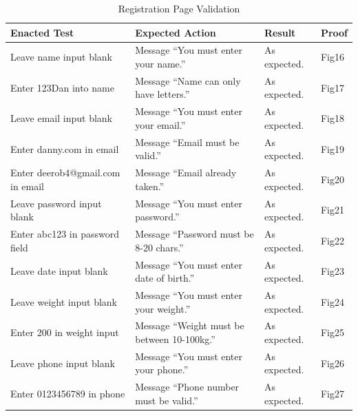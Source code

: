 \documentclass{article}[12pt,a4paper]
\begin{document}
\begin{table}[h]
\begin{tabular}{|l|l|l|l|}
\hline
\textbf{Enacted Test}          & \textbf{Expected Action}                  & \textbf{Result} & \textbf{Proof} \\ \hline
Leave name input blank         & Message ``You must enter your name.''        & As expected.    & Fig16           \\ \hline
Enter 123Dan into name         & Message ``Name can only have letters.''      & As expected.    & Fig17           \\ \hline
Leave email input blank        & Message ``You must enter your email.''       & As expected.    & Fig18           \\ \hline
Enter danny.com in email       & Message ``Email must be valid.''             & As expected.    & Fig19          \\ \hline
Enter deerob4@gmail.com in email & Message ``Email already taken.''             & As expected.    & Fig20           \\ \hline
Leave password input blank     & Message ``You must enter password.''         & As expected.    & Fig21           \\ \hline
Enter abc123 in password field & Message ``Password must be 8-20 chars.''     & As expected.    & Fig22           \\ \hline
Leave date input blank         & Message ``You must enter date of birth.''    & As expected.    & Fig23           \\ \hline
Leave weight input blank       & Message ``You must enter your weight.''      & As expected.    & Fig24           \\ \hline
Enter 200 in weight input      & Message ``Weight must be between 10-100kg.'' & As expected.    & Fig25           \\ \hline
Leave phone input blank        & Message ``You must enter your phone.''       & As expected.    & Fig26          \\ \hline
Enter 0123456789 in phone      & Message ``Phone number must be valid.''      & As expected.    & Fig27          \\ \hline
\end{tabular}
\caption{Registration Page Validation}
\end{table}
\end{document}
